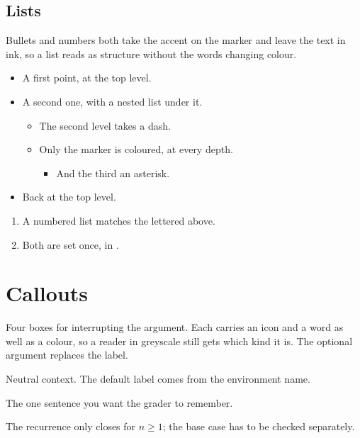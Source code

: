 \documentclass[letterpaper,11pt]{article}
\begin{document}
\subsection*{Lists}

Bullets and numbers both take the accent on the marker and leave the text in ink, so a list reads as structure without the words changing colour.

\begin{itemize}
  \item A first point, at the top level.
  \item A second one, with a nested list under it.
  \begin{itemize}
    \item The second level takes a dash.
    \item Only the marker is coloured, at every depth.
    \begin{itemize}
      \item And the third an asterisk.
    \end{itemize}
  \end{itemize}
  \item Back at the top level.
\end{itemize}

\begin{enumerate}
  \item A numbered list matches the lettered  above.
  \item Both are set once, in .
\end{enumerate}

\section{Callouts}

Four boxes for interrupting the argument.
Each carries an icon and a word as well as a colour, so a reader in greyscale still gets which kind it is.
The optional argument replaces the label.

\begin{callout}
  Neutral context.
  The default label comes from the environment name.
\end{callout}

\begin{tip}
  The one sentence you want the grader to remember.
\end{tip}

\begin{warn}
  The recurrence only closes for $n\geq 1$; the base case has to be checked separately.
\end{warn}
\end{document}
